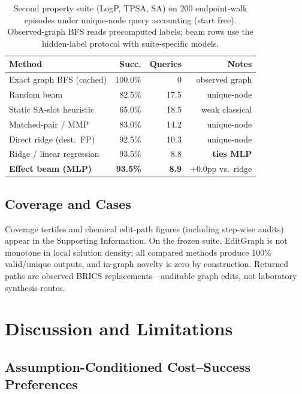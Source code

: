 \begin{table}[t]
\caption{Second property suite (LogP, TPSA, SA) on 200 endpoint-walk episodes under unique-node query accounting (start free). Observed-graph BFS reads precomputed labels; beam rows use the hidden-label protocol with suite-specific models.}
\label{tab:suite_b}
\centering
\small
\begin{tabular}{lrrr}
\toprule
Method & Succ. & Queries & Notes \\
\midrule
Exact graph BFS (cached) & 100.0\% & 0 & observed graph \\
Random beam & 82.5\% & 17.5 & unique-node \\
Static SA-slot heuristic & 65.0\% & 18.5 & weak classical \\
Matched-pair / MMP & 83.0\% & 14.2 & unique-node \\
Direct ridge (dest.\ FP) & 92.5\% & 10.3 & unique-node \\
Ridge / linear regression & 93.5\% & 8.8 & \textbf{ties MLP} \\
\textbf{Effect beam (MLP)} & \textbf{93.5\%} & \textbf{8.9} & $+0.0$pp vs.\ ridge \\
\bottomrule
\end{tabular}
\end{table}


\subsection{Coverage and Cases}
\label{sec:cases}

Coverage tertiles and chemical edit-path figures (including step-wise audits) appear in the Supporting Information. On the frozen suite, EditGraph is not monotone in local solution density; all compared methods produce 100\% valid/unique outputs, and in-graph novelty is zero by construction. Returned paths are observed BRICS replacements---auditable graph edits, not laboratory synthesis routes.

\section{Discussion and Limitations}
\label{sec:limitations}

\subsection{Assumption-Conditioned Cost--Success Preferences}
\label{sec:regimes}

